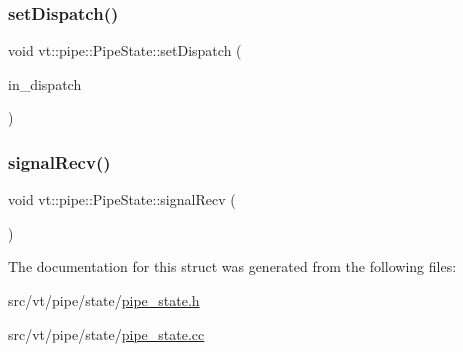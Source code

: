 \mbox{\label{structvt_1_1pipe_1_1_pipe_state_a436083ce72366f0bece034065bb3aca1}} 
\subsubsection{\texorpdfstring{set\+Dispatch()}{setDispatch()}}
{\footnotesize\ttfamily void vt\+::pipe\+::\+Pipe\+State\+::set\+Dispatch (\begin{DoxyParamCaption}\item[{\hyperlink{structvt_1_1pipe_1_1_pipe_state_ad81b637847d9c3185420c58c9272ed7d}{Dispatch\+Func\+Type}}]{in\+\_\+dispatch }\end{DoxyParamCaption})}

\mbox{\label{structvt_1_1pipe_1_1_pipe_state_a3cd72e7d91b3752e2cb19bc42b7de397}} 
\subsubsection{\texorpdfstring{signal\+Recv()}{signalRecv()}}
{\footnotesize\ttfamily void vt\+::pipe\+::\+Pipe\+State\+::signal\+Recv (\begin{DoxyParamCaption}{ }\end{DoxyParamCaption})}



The documentation for this struct was generated from the following files\+:\begin{DoxyCompactItemize}
\item 
src/vt/pipe/state/\hyperlink{pipe__state_8h}{pipe\+\_\+state.\+h}\item 
src/vt/pipe/state/\hyperlink{pipe__state_8cc}{pipe\+\_\+state.\+cc}\end{DoxyCompactItemize}
